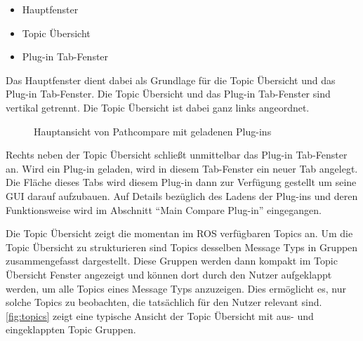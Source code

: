 \begin{itemize}
\item Hauptfenster
\item Topic Übersicht
\item Plug-in Tab-Fenster
\end{itemize}

Das Hauptfenster dient dabei als Grundlage für die Topic Übersicht und das
Plug-in Tab-Fenster. Die Topic Übersicht und das Plug-in Tab-Fenster sind vertikal
getrennt. Die Topic Übersicht ist dabei ganz links angeordnet.

\begin{figure}[t]
  \begin{center}
  \end{center}
  \caption{Hauptansicht von Pathcompare mit geladenen Plug-ins}
  \label{fig:pathcompare}
\end{figure}

Rechts neben der Topic Übersicht schließt unmittelbar das Plug-in Tab-Fenster
an. Wird ein Plug-in geladen, wird in diesem Tab-Fenster ein neuer Tab
angelegt. Die Fläche dieses Tabs wird diesem Plug-in dann zur Verfügung
gestellt um seine GUI darauf aufzubauen. Auf Details bezüglich des Ladens der
Plug-ins und deren Funktionsweise wird im Abschnitt ``Main
Compare Plug-in'' eingegangen. 

Die Topic Übersicht zeigt die momentan im ROS verfügbaren Topics an.  Um die
Topic Übersicht zu strukturieren sind Topics desselben Message Typs in Gruppen
zusammengefasst dargestellt.  Diese Gruppen werden dann kompakt im Topic
Übersicht Fenster angezeigt und können dort durch den Nutzer aufgeklappt
werden, um alle Topics eines Message Typs anzuzeigen. Dies ermöglicht
es, nur solche Topics zu beobachten, die tatsächlich für den Nutzer relevant
sind. \autoref{fig:topics} zeigt eine typische Ansicht der Topic Übersicht mit
aus- und eingeklappten Topic Gruppen.

